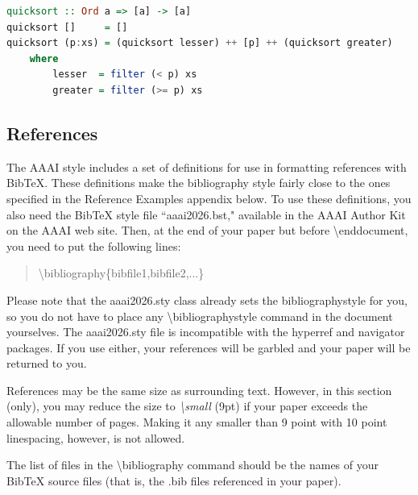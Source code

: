 \begin{listing}[tb]%
\caption{Example listing {\tt quicksort.hs}}%
\label{lst:listing}%
\begin{lstlisting}[language=Haskell]
quicksort :: Ord a => [a] -> [a]
quicksort []     = []
quicksort (p:xs) = (quicksort lesser) ++ [p] ++ (quicksort greater)
	where
		lesser  = filter (< p) xs
		greater = filter (>= p) xs
\end{lstlisting}
\end{listing}

\subsection{References}
The AAAI style includes a set of definitions for use in formatting references with BibTeX. These definitions make the bibliography style fairly close to the ones  specified in the Reference Examples appendix below. To use these definitions, you also need the BibTeX style file ``aaai2026.bst," available in the AAAI Author Kit on the AAAI web site. Then, at the end of your paper but before \textbackslash end{document}, you need to put the following lines:

\begin{quote}
\begin{small}
\textbackslash bibliography\{bibfile1,bibfile2,...\}
\end{small}
\end{quote}

Please note that the aaai2026.sty class already sets the bibliographystyle for you, so you do not have to place any \textbackslash bibliographystyle command in the document yourselves. The aaai2026.sty file is incompatible with the hyperref and navigator packages. If you use either, your references will be garbled and your paper will be returned to you.

References may be the same size as surrounding text.
However, in this section (only), you may reduce the size to {\em \textbackslash small} (9pt) if your paper exceeds the allowable number of pages. Making it any smaller than 9 point with 10 point linespacing, however, is not allowed.

The list of files in the \textbackslash bibliography command should be the names of your BibTeX source files (that is, the .bib files referenced in your paper).

